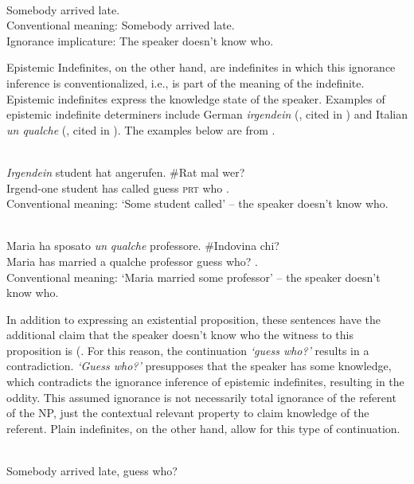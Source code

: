 \documentclass[output=paper,modfonts,nonflat,draftmode]{langsci/langscibook}
\begin{document}
\ea
\ea\label{owusu:ex25}\\
 Somebody arrived late.\\
\ea Conventional meaning: Somebody arrived late.\\
\ex Ignorance implicature: The speaker doesn't know who.
\z \z\z


Epistemic Indefinites, on the other hand, are indefinites in which this ignorance inference is conventionalized, i.e., is part of the meaning of the indefinite. Epistemic indefinites express the knowledge state of the speaker. Examples of epistemic indefinite determiners include German \emph{irgendein} (\citealt{Haspelmath1997,KratzerShimoyama2002}, cited in \citealt{AloniPort2015}) and Italian \emph{un qualche}  (\citealt{Zamparelli2007}, cited in \citealt{AloniPort2015}). The examples below are from \citet{AloniPort2015}.

\ea\label{owusu:ex26}\\
 \gll\emph{Irgendein} student hat angerufen. \#Rat mal wer?  \\
     Irgend-one student has called guess \textsc{prt} who .\\
\glt Conventional meaning: `Some student called' – the speaker doesn’t know who.

\ex \label{owusu:ex28}\\
\gll Maria ha sposato \emph{un} \emph{qualche} professore. \#Indovina chi? \\
      Maria has married a qualche professor guess who? .\\
\glt Conventional meaning: `Maria married some professor' – the speaker doesn’t know who.
\z 

In addition to expressing an existential proposition, these sentences have the additional claim that the speaker doesn't know who the witness to this proposition is (\citet{AloniPort2015}. For this reason, the continuation \emph{`guess who?'} results in a contradiction. \emph{`Guess who?'} presupposes that the speaker has some knowledge, which contradicts the ignorance inference of epistemic indefinites, resulting in the oddity.  This assumed ignorance is not necessarily total ignorance of the referent of the NP,  just the contextual relevant property to claim knowledge of the referent. Plain indefinites, on the other hand, allow for this type of continuation.

  \ea\label{owusu:ex26:2}\\
 Somebody arrived late, guess who?
 \z 
 
\end{document}
